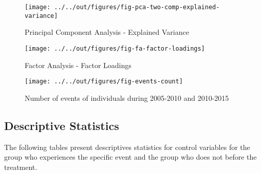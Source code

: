 \documentclass[12pt, a4paper, fleqn, parskip]{scrartcl}
\begin{document}
\begin{figure}[H]
    \centering
    \texttt{[image: ../../out/figures/fig-pca-two-comp-explained-variance]}
    \caption{Principal Component Analysis - Explained Variance}
    \label{fig:pca_ev}
\end{figure}

\begin{figure}[H]
    \centering
    \texttt{[image: ../../out/figures/fig-fa-factor-loadings]}
    \caption{Factor Analysis - Factor Loadings}
    \label{fig:fa_loadings}
\end{figure}

\begin{figure}[H]
    \centering
    \texttt{[image: ../../out/figures/fig-events-count]}
    \caption{Number of events of individuals during 2005-2010 and 2010-2015}
    \label{fig:events_count}
\end{figure}



\subsection{Descriptive Statistics} %
\label{sub:descriptive_statistics}

The following tables present descriptives statistics for control variables for
the group who experiences the specific event and the group who does not before
the treatment.
















\end{document}
